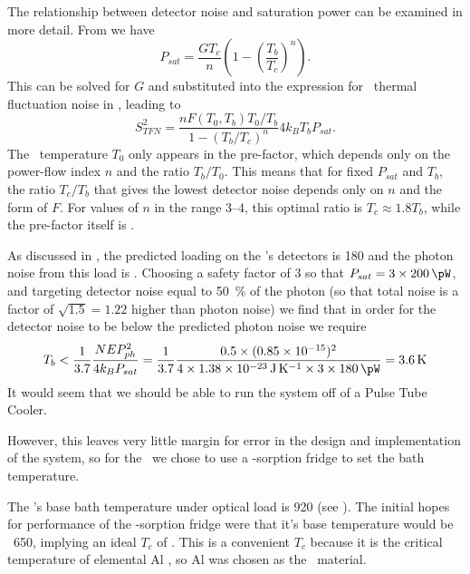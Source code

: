 The relationship between detector noise and saturation power can be examined in more detail.
From  we have
\begin{equation} \label{eqn:ch5-psat}
P_{sat} = \frac{G T_c}{n}\left(1 - \left(\frac{T_b}{T_c}\right)^n\right).
\end{equation}
This can be solved for $G$ and substituted into the expression for \TES\ thermal fluctuation noise in , leading to
\begin{equation} \label{eqn:ch5-tes-noise}
S^2_{TFN} = \frac{n F(T_0, T_b) T_0 / T_b}{1-(T_b/T_c)^n} 4 k_B T_b P_{sat}.
\end{equation}
The \TES\ temperature $T_0$ only appears in the pre-factor, which depends only on the power-flow index $n$ and the ratio $T_b/T_0$.
This means that for fixed $P_{sat}$ and $T_b$, the ratio $T_c/T_b$ that gives the lowest detector noise depends only on $n$ and the form of $F$.
For values of $n$ in the range 3--4, this optimal ratio is $T_c \approx 1.8 T_b$, while the pre-factor itself is .

As discussed in , the predicted loading on the \Imager's detectors is \SI{180}{\pW} and the photon noise from this load is .
Choosing a safety factor of 3 so that $P_{sat} = 3 \times \SI{200}{\pW}$, and targeting detector noise equal to \SI{50}{\percent} of the photon (so that total noise is a factor of $\sqrt{1.5} = 1.22$ higher than photon noise) we find that in order for the detector noise to be below the predicted photon noise we require
\begin{equation}
  T_b < \frac{1}{3.7} \frac{\NEPph^2}{4 k_B P_{sat}} =
        \frac{1}{3.7} \frac{0.5 \times (\num{0.85e-15})^2}{4 \times \SI{1.38e-23}{\J\per\K} \times 3 \times \SI{180}{\pW}} = 
        \SI{3.6}{\K}
\end{equation}
It would seem that we should be able to run the system off of a Pulse Tube Cooler.

However, this leaves very little margin for error in the design and implementation of the system, so for the \Imager\ we chose to use a -sorption fridge to set the bath temperature.

The \Imager's base bath temperature under optical load is \SI{920}{\pW} (see ).
The initial hopes for performance of the -sorption fridge were that it's base temperature would be ~\SI{650}{\mK}, implying an ideal $T_c$ of .
This is a convenient $T_c$ because it is the critical temperature of elemental Al \cite{matthias_superconductivity_1963}, so Al was chosen as the \TES\ material.

